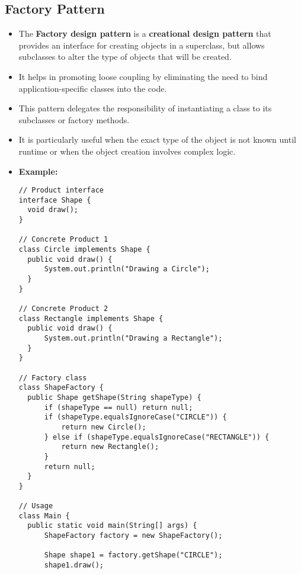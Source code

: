 \documentclass[12pt]{article}
\begin{document}
\subsection{Factory Pattern}
\begin{itemize}
    \item The \textbf{Factory design pattern} is a \textbf{creational design pattern} that provides an interface for creating objects in a superclass, but allows subclasses to alter the type of objects that will be created.
    \item It helps in promoting loose coupling by eliminating the need to bind application-specific classes into the code.
    \item This pattern delegates the responsibility of instantiating a class to its subclasses or factory methods.
    \item It is particularly useful when the exact type of the object is not known until runtime or when the object creation involves complex logic.
    \item \textbf{Example:}
          \begin{lstlisting}
// Product interface
interface Shape {
  void draw();
}

// Concrete Product 1
class Circle implements Shape {
  public void draw() {
      System.out.println("Drawing a Circle");
  }
}

// Concrete Product 2
class Rectangle implements Shape {
  public void draw() {
      System.out.println("Drawing a Rectangle");
  }
}

// Factory class
class ShapeFactory {
  public Shape getShape(String shapeType) {
      if (shapeType == null) return null;
      if (shapeType.equalsIgnoreCase("CIRCLE")) {
          return new Circle();
      } else if (shapeType.equalsIgnoreCase("RECTANGLE")) {
          return new Rectangle();
      }
      return null;
  }
}

// Usage
class Main {
  public static void main(String[] args) {
      ShapeFactory factory = new ShapeFactory();

      Shape shape1 = factory.getShape("CIRCLE");
      shape1.draw();


\end{lstlisting}
\end{itemize}
\end{document}
